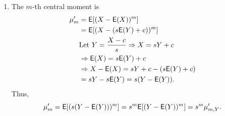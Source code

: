 \documentclass[12pt]{article}
\newcommand{\E}{{\sf E}}
\newenvironment{problem}[2][Problem]{\begin{trivlist}
\item[\hskip \labelsep {\bfseries #1}\hskip \labelsep {\bfseries #2.}]}
{\end{trivlist}}
\begin{document}
\begin{problem}{5}
\begin{enumerate}
    \item The $m$-th central moment is
    \[
      \begin{aligned}
        \mu_m' &= \E[(X - \E(X))^m] \\
        &= \E[(X - (s\E(Y) + c))^m] \\
        &\text{Let } Y = \frac{X - c}{s} \Rightarrow X = sY + c\\
        &\Rightarrow \E(X) = s\E(Y) + c\\
        &\Rightarrow X - \E(X) = sY + c - (s\E(Y) + c)\\
        &= sY - s\E(Y) = s(Y - \E(Y)).\\
      \end{aligned}
    \]
    Thus,
    \[
      \mu_m' = \E[(s(Y - \E(Y)))^m] = s^m \E[(Y - \E(Y))^m] = s^m \mu_{m,Y}'.
    \]
  \end{enumerate}
\end{problem}
\end{document}
